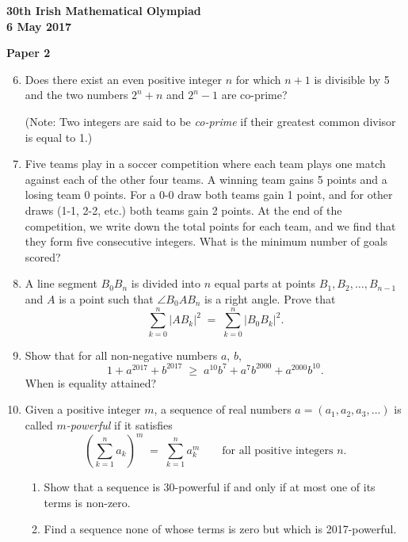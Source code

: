 \documentclass[12pt]{article}
\begin{document}
\newpage
\begin{center}
{\large\bfseries 30th Irish Mathematical Olympiad\\6 May 2017}
\end{center}
\bigskip\noindent\textbf{Paper 2}\bigskip
\begin{enumerate}
\setcounter{enumi}{5}
\item Does there exist an even positive integer $n$ for which $n+1$ is divisible by 5 and the two numbers $2^n + n$ and $2^n - 1$ are co-prime?

(Note: Two integers are said to be \emph{co-prime} if their greatest common divisor is equal to 1.)

\item Five teams play in a soccer competition where each team plays one match against each of the other four teams. A winning team gains 5 points and a losing team 0 points. For a 0-0 draw both teams gain 1 point, and for other draws (1-1, 2-2, etc.) both teams gain 2 points. At the end of the competition, we write down the total points for each team, and we find that they form five consecutive integers. What is the minimum number of goals scored?

\item A line segment $B_0B_n$ is divided into $n$ equal parts at points $B_1, B_2, \ldots, B_{n-1}$ and $A$ is a point such that $\angle B_0AB_n$ is a right angle. Prove that
\[
\sum_{k=0}^{n} |AB_k|^2 \;=\; \sum_{k=0}^{n} |B_0B_k|^2.
\]

\item Show that for all non-negative numbers $a$, $b$,
\[
1 + a^{2017} + b^{2017} \;\geq\; a^{10}b^7 + a^7b^{2000} + a^{2000}b^{10}.
\]
When is equality attained?

\item Given a positive integer $m$, a sequence of real numbers $a = (a_1, a_2, a_3, \ldots)$ is called \emph{$m$-powerful} if it satisfies
\[
\left(\sum_{k=1}^{n} a_k\right)^m \;=\; \sum_{k=1}^{n} a_k^m \qquad \text{for all positive integers } n.
\]
\begin{enumerate}
\item[(a)] Show that a sequence is 30-powerful if and only if at most one of its terms is non-zero.
\item[(b)] Find a sequence none of whose terms is zero but which is 2017-powerful.
\end{enumerate}
\end{enumerate}
\end{document}
